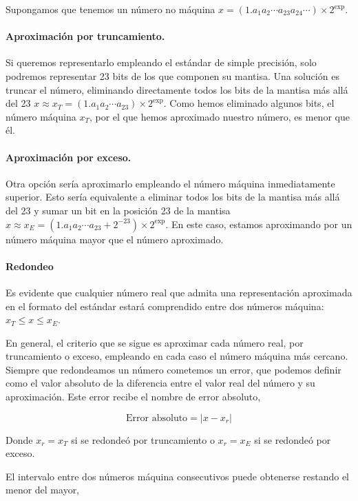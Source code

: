 \begin{paracol}{2}
Supongamos que tenemos un número no máquina $x=(1.a_1a_2\cdots a_{23}a_{24}\cdots)\times2^{\text{exp}}$. 

\paragraph{Aproximación por truncamiento.} Si queremos representarlo empleando el estándar de simple precisión, solo podremos representar 23 bits de los que componen su mantisa. Una solución es truncar el número, eliminando directamente todos los bits de la mantisa más allá del 23 $x\approx x_T= (1.a_1a_2\cdots a_{23})\times2^{\text{exp}}$. Como hemos eliminado algunos bits, el número máquina $x_T$, por el que hemos aproximado nuestro número, es menor que él. 

\paragraph{Aproximación por exceso.}  Otra opción sería aproximarlo empleando el número máquina inmediatamente superior.  Esto sería equivalente a eliminar todos los bits de la mantisa más allá del 23 y sumar un bit en la posición 23 de la mantisa $x\approx x_E=  (1.a_1a_2\cdots a_{23}+2^{-23})\times2^{\text{exp}}$. En este caso, estamos aproximando por un número máquina mayor que el número aproximado.


\paragraph{Redondeo} Es evidente que cualquier número real que admita una representación aproximada en el formato del estándar estará comprendido entre dos números máquina: $x_T\leq x\leq x_E$. 


En general, el criterio que se sigue es aproximar cada número real, por truncamiento o exceso, empleando en cada caso el número máquina más cercano. 
Siempre que redondeamos un número cometemos un error, que podemos definir como el valor absoluto de la diferencia entre  el valor real  del número y su aproximación. Este error recibe el nombre de error absoluto,
\end{paracol}
\begin{equation*}
\text{Error absoluto}=\vert x-x_r\vert
\end{equation*}

\begin{paracol}{2}
Donde $x_r=x_T$ si se redondeó por truncamiento o $x_r=x_E$ si se redondeó por exceso.

El intervalo entre dos números máquina consecutivos puede obtenerse restando el menor del mayor,
\end{paracol}

